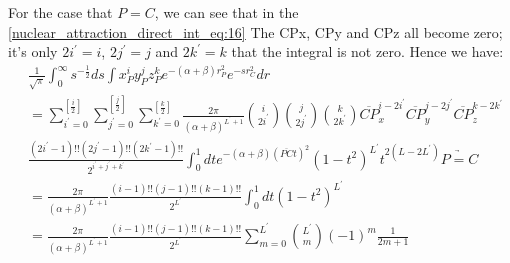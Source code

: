 For the case that $P = C$, we can see that in the \ref{nuclear_attraction_direct_int_eq:16}
The CPx, CPy and CPz all become zero; it's only $2i^{'}=i$, $2j^{'}=j$ and $2k^{'}=k$
that the integral is not zero. Hence we have:
\begin{equation}
\begin{split}
&\frac{1}{\sqrt{\pi}} 
 \int^{\infty}_{0} s^{-\frac{1}{2}} ds 
 \int x_{P}^{i}y_{P}^{j}z_{P}^{k} e^{-(\alpha+\beta)r_{P}^{2}}e^{-sr_{C}^{2}} dr \\
&= 
\sum_{i^{'}=0}^{\left[ \frac{i}{2}\right]}
\sum_{j^{'}=0}^{\left[ \frac{j}{2}\right]}
\sum_{k^{'}=0}^{\left[ \frac{k}{2}\right]} 
\frac{2\pi}{(\alpha+\beta)^{L^{'}+1}}
\binom{i}{2i^{'}}\binom{j}{2j^{'}}\binom{k}{2k^{'}}
\overline{CP}_{x}^{i-2i^{'}}\overline{CP}_{y}^{j-2j^{'}}\overline{CP}_{z}^{k-2k^{'}} \\
&\frac{(2i^{'}-1)!!(2j^{'}-1)!!(2k^{'}-1)!!}{2^{i^{'}+j^{'}+k^{'}}} 
\int^{1}_{0} dt
e^{-(\alpha+\beta)(\overline{PC}t)^{2}}
(1-t^{2})^{L^{'} }t^{2(L-2L^{'})} \underrightarrow{ P = C} \\
&=\frac{2\pi}{(\alpha+\beta)^{L^{'}+1}}\frac{(i-1)!!(j-1)!!(k-1)!!}{2^{L^{'}}} 
\int^{1}_{0} dt
(1-t^{2})^{L^{'}} \\
&=\frac{2\pi}{(\alpha+\beta)^{L^{'}+1}}\frac{(i-1)!!(j-1)!!(k-1)!!}{2^{L^{'}}} 
\sum_{m=0}^{L^{'}}\binom{L^{'}}{m}(-1)^{m}\frac{1}{2m+1}
\end{split}
\label{nuclear_attraction_direct_int_eq:21}
\end{equation}

